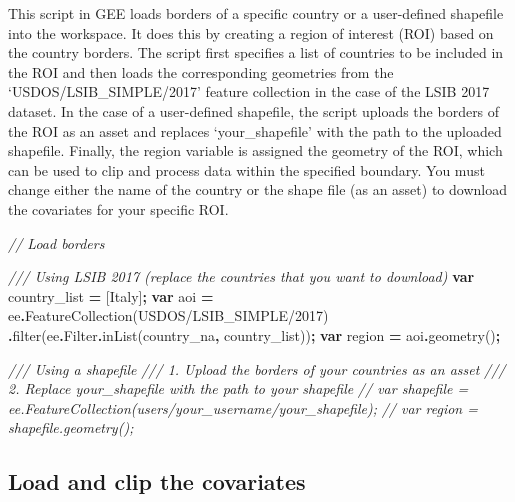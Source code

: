 \documentclass[
  10pt,
  b5paper,
  oneside]{book}
\newenvironment{Shaded}{\begin{snugshade}}{\end{snugshade}}
\newcommand{\AttributeTok}[1]{\textcolor[rgb]{0.77,0.63,0.00}{#1}}
\newcommand{\CommentTok}[1]{\textcolor[rgb]{0.56,0.35,0.01}{\textit{#1}}}
\newcommand{\FunctionTok}[1]{\textcolor[rgb]{0.00,0.00,0.00}{#1}}
\newcommand{\KeywordTok}[1]{\textcolor[rgb]{0.13,0.29,0.53}{\textbf{#1}}}
\newcommand{\NormalTok}[1]{#1}
\newcommand{\OperatorTok}[1]{\textcolor[rgb]{0.81,0.36,0.00}{\textbf{#1}}}
\newcommand{\StringTok}[1]{\textcolor[rgb]{0.31,0.60,0.02}{#1}}
\begin{document}
This script in GEE loads borders of a specific country or a user-defined shapefile into the workspace. It does this by creating a region of interest (ROI) based on the country borders. The script first specifies a list of countries to be included in the ROI and then loads the corresponding geometries from the `USDOS/LSIB\_SIMPLE/2017' feature collection in the case of the LSIB 2017 dataset. In the case of a user-defined shapefile, the script uploads the borders of the ROI as an asset and replaces `your\_shapefile' with the path to the uploaded shapefile. Finally, the region variable is assigned the geometry of the ROI, which can be used to clip and process data within the specified boundary. You must change either the name of the country or the shape file (as an asset) to download the covariates for your specific ROI.

\begin{Shaded}
\begin{Highlighting}[]
\CommentTok{// Load borders }

\CommentTok{/// Using LSIB 2017 (replace the countries that you want to download)}
\KeywordTok{var}\NormalTok{ country\_list }\OperatorTok{=}\NormalTok{ [}\StringTok{\textquotesingle{}Italy\textquotesingle{}}\NormalTok{]}\OperatorTok{;}
\KeywordTok{var}\NormalTok{ aoi }\OperatorTok{=}\NormalTok{ ee}\OperatorTok{.}\FunctionTok{FeatureCollection}\NormalTok{(}\StringTok{\textquotesingle{}USDOS/LSIB\_SIMPLE/2017\textquotesingle{}}\NormalTok{)}
  \OperatorTok{.}\FunctionTok{filter}\NormalTok{(ee}\OperatorTok{.}\AttributeTok{Filter}\OperatorTok{.}\FunctionTok{inList}\NormalTok{(}\StringTok{\textquotesingle{}country\_na\textquotesingle{}}\OperatorTok{,}\NormalTok{ country\_list))}\OperatorTok{;}
\KeywordTok{var}\NormalTok{ region }\OperatorTok{=}\NormalTok{ aoi}\OperatorTok{.}\FunctionTok{geometry}\NormalTok{()}\OperatorTok{;}

\CommentTok{/// Using a shapefile}
\CommentTok{/// 1. Upload the borders of your countries as an asset}
\CommentTok{/// 2. Replace \textquotesingle{}your\_shapefile\textquotesingle{} with the path to your shapefile}
\CommentTok{// var shapefile = ee.FeatureCollection(\textquotesingle{}users/your\_username/your\_shapefile\textquotesingle{});}
\CommentTok{// var region = shapefile.geometry();}
\end{Highlighting}
\end{Shaded}

\hypertarget{load-and-clip-the-covariates}{%
\subsection{Load and clip the covariates}\label{load-and-clip-the-covariates}}
\end{document}

